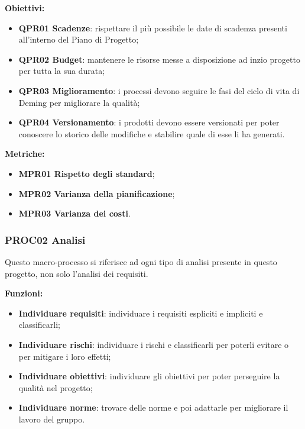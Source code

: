 \documentclass[../piano_di_qualifica.tex]{subfiles}
\begin{document}
\textbf{Obiettivi:}
\smallbreak
\begin{itemize}
	\item \textbf{QPR01 Scadenze}: rispettare il più possibile le date di scadenza presenti all'interno del Piano di Progetto;
	\item \textbf{QPR02 Budget}: mantenere le risorse messe a disposizione ad inzio progetto per tutta la sua durata;
	\item \textbf{QPR03 Miglioramento}: i processi devono seguire le fasi del ciclo di vita di Deming per migliorare la qualità;
	\item \textbf{QPR04 Versionamento}: i prodotti devono essere versionati per poter conoscere lo storico delle modifiche e stabilire quale di esse li ha generati.
\end{itemize}

\textbf{Metriche:}
\smallbreak
\begin{itemize}
	\item \textbf{MPR01 Rispetto degli standard};
	\item \textbf{MPR02 Varianza della pianificazione};
	\item \textbf{MPR03 Varianza dei costi}.
\end{itemize}

\subsubsection{PROC02 Analisi}
Questo macro-processo si riferisce ad ogni tipo di analisi presente in questo progetto, non solo l'analisi dei requisiti.

\textbf{Funzioni:}
\smallbreak
\begin{itemize}
	\item \textbf{Individuare requisiti}: individuare i requisiti espliciti e impliciti e classificarli;
	\item \textbf{Individuare rischi}: individuare i rischi e classificarli per poterli evitare o per mitigare i loro effetti;
	\item \textbf{Individuare obiettivi}: individuare gli obiettivi per poter perseguire la qualità nel progetto;
	\item \textbf{Individuare norme}: trovare delle norme e poi adattarle per migliorare il lavoro del gruppo.
\end{itemize}
\end{document}
